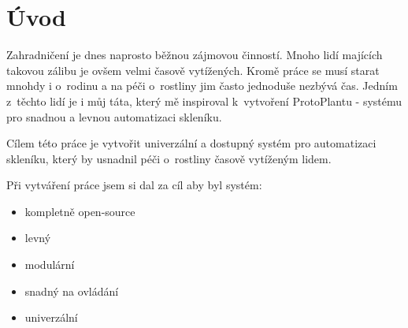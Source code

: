 \chapter*{Úvod}

Zahradničení je dnes naprosto běžnou zájmovou činností. Mnoho lidí majících takovou zálibu je ovšem velmi časově vytížených. Kromě práce se musí starat mnohdy i o~rodinu a na péči o~rostliny jim často jednoduše nezbývá čas. Jedním z~těchto lidí je i můj táta, který mě inspiroval k~vytvoření ProtoPlantu - systému pro snadnou a levnou automatizaci skleníku.

Cílem této práce je vytvořit univerzální a dostupný systém pro automatizaci skleníku, který by usnadnil péči o~rostliny časově vytíženým lidem. 

Při vytváření práce jsem si dal za cíl aby byl systém:
\begin{itemize}
    \item kompletně open-source
    \item levný
    \item modulární
    \item snadný na ovládání
    \item univerzální
\end{itemize}

\newpage
